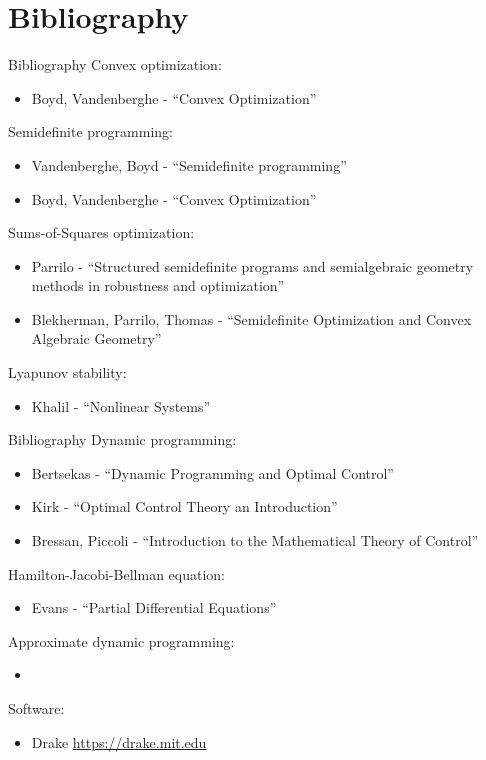 \documentclass[aspectratio=169]{beamer}
\begin{document}
\section{Bibliography}
\begin{frame}{Bibliography}
\footnotesize
Convex optimization:
\begin{itemize}
\item
Boyd, Vandenberghe - ``Convex Optimization''
\end{itemize}
Semidefinite programming:
\begin{itemize}
\item
Vandenberghe, Boyd - ``Semidefinite programming''
\item
Boyd, Vandenberghe - ``Convex Optimization''
\end{itemize}
Sums-of-Squares optimization:
\begin{itemize}
\item
Parrilo - ``Structured semidefinite programs and semialgebraic geometry methods in robustness and optimization''
\item
Blekherman, Parrilo, Thomas - ``Semidefinite Optimization and Convex Algebraic Geometry''
\end{itemize}
Lyapunov stability:
\begin{itemize}
\item
Khalil - ``Nonlinear Systems''
\end{itemize}
\end{frame}

\begin{frame}{Bibliography}
\footnotesize
Dynamic programming:
\begin{itemize}
\item
Bertsekas - ``Dynamic Programming and Optimal Control''
\item
Kirk - ``Optimal Control Theory an Introduction''
\item
Bressan, Piccoli - ``Introduction to the Mathematical Theory of Control''
\end{itemize}
Hamilton-Jacobi-Bellman equation:
\begin{itemize}
\item
Evans - ``Partial Differential Equations''
\end{itemize}
Approximate dynamic programming:
\begin{itemize}
\item
\end{itemize}
Software:
\begin{itemize}
\item
Drake \href{https://drake.mit.edu}{{\color{blue}https://drake.mit.edu}}
\end{itemize}
\end{frame}
\end{document}
